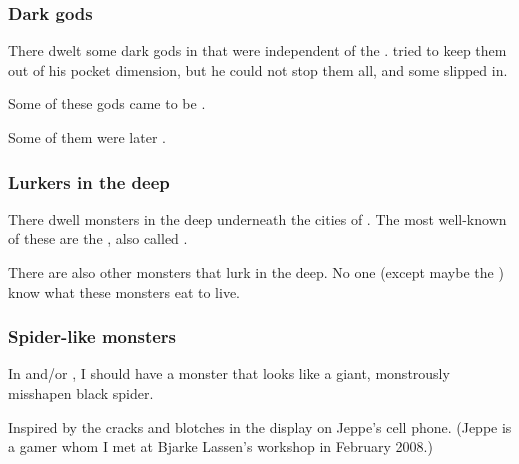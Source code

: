\subsubsection{Dark gods}
There dwelt some dark gods in \Nyx{} that were independent of the \banes. 
\Daggerrain{} tried to keep them out of his pocket dimension, but he could not stop them all, and some slipped in. 

Some of these gods came to be . 

Some of them were later . 





\subsubsection{Lurkers in the deep}
There dwell monsters in the deep underneath the cities of \Nyx. 
The most well-known of these are the \mothlain, also called . 

There are also other monsters that lurk in the deep. 
No one (except maybe the ) know what these monsters eat to live. 





\subsubsection{Spider-like monsters}
In \Nyx{} and/or \Erebos, I should have a monster that looks like a giant, monstrously misshapen black spider. 

Inspired by the cracks and blotches in the display on Jeppe's cell phone. (Jeppe is a gamer whom I met at Bjarke Lassen's workshop in February 2008.) 


















